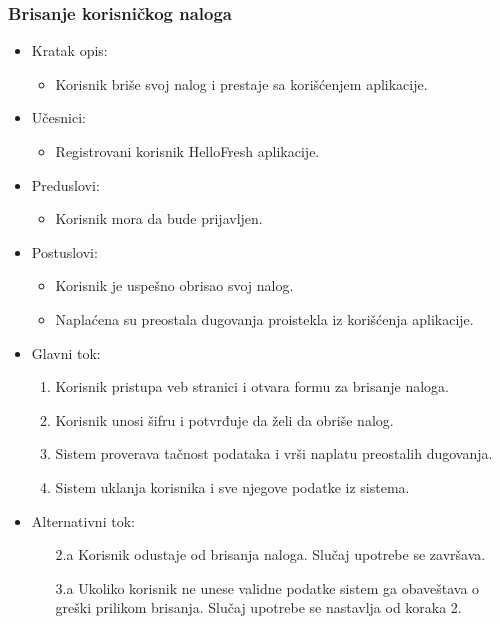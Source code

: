 \subsubsection{Brisanje korisničkog naloga}

\begin{itemize}
    \item Kratak opis:
        \begin{itemize}
            \item Korisnik briše svoj nalog i prestaje sa korišćenjem aplikacije.
        \end{itemize}
    \item Učesnici:
        \begin{itemize}
            \item Registrovani korisnik HelloFresh aplikacije.
        \end{itemize}
    \item Preduslovi:
        \begin{itemize}
            \item Korisnik mora da bude prijavljen.
        \end{itemize}
    \item Postuslovi:
        \begin{itemize}
            \item Korisnik je uspešno obrisao svoj nalog.
            \item Naplaćena su preostala dugovanja proistekla iz korišćenja aplikacije.
        \end{itemize}
    \item Glavni tok:
        \begin{enumerate}
            \item Korisnik pristupa veb stranici i otvara formu za brisanje naloga.
            \item Korisnik unosi šifru i potvrđuje da želi da obriše nalog.
            \item Sistem proverava tačnost podataka i vrši naplatu preostalih dugovanja.
            \item Sistem uklanja korisnika i sve njegove podatke iz sistema.
        \end{enumerate}
    \item Alternativni tok:
        \begin{itemize}
            \item[2.a] Korisnik odustaje od brisanja naloga. Slučaj upotrebe se završava.
			\item[3.a] Ukoliko korisnik ne unese validne podatke sistem ga obaveštava o greški prilikom brisanja. Slučaj upotrebe se nastavlja od koraka 2.
        \end{itemize}
\end{itemize}
